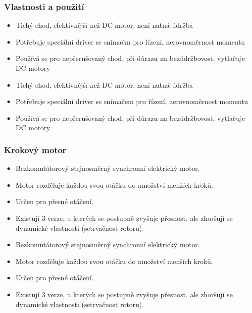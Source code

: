 \subsubsection*{Vlastnosti a použití}
\begin{itemize}
  \item Tichý chod, efektivnější než DC motor, není nutná údržba
  \item Potřebuje speciální driver se snímačm pro řízení, nerovnoměrnost momentu
  \item Používá se pro nepřerušovaný chod, při důrazu na bezúdržbovost, vytlačuje DC motory
    \item Tichý chod, efektivnější než DC motor, není nutná údržba
    \item Potřebuje speciální driver se snímačem pro řízení, nerovnoměrnost momentu
    \item Používá se pro nepřerušovaný chod, při důrazu na bezúdržbovost, vytlačuje DC motory
\end{itemize}

\subsubsection*{Krokový motor}
\begin{itemize}
  \item Bezkomutátorový stejnosměrný synchronní elektrický motor.
  \item Motor rozděluje každou svou otáčku do množství menžích kroků.
  \item Určen pro přesné otáčení.
  \item Existují 3 verze, u kterých se postupně zvyšuje přesnost, ale zhoršují se dynamické vlastnosti (setrvačnost rotoru).
    \item Bezkomutátorový stejnosměrný synchronní elektrický motor.
    \item Motor rozděluje každou svou otáčku do množství menších kroků.
    \item Určen pro přesné otáčení.
    \item Existují 3 verze, u kterých se postupně zvyšuje přesnost, ale zhoršují se dynamické vlastnosti (setrvačnost rotoru).
\end{itemize}

